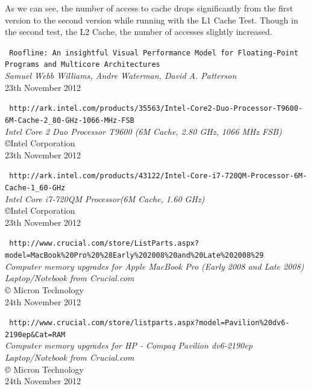 \documentclass[a4paper,10pt,openright,openbib]{article}
\begin{document}
As we can see, the number of access to cache drops significantly from the first version to the second version while running with the L1 Cache Test. Though in the second test, the L2 Cache, the number of accesses slightly increased.


\begin{thebibliography}{9}
	\texttt{\small
	Roofline: An insightful Visual Performance Model for Floating-Point Programs and Multicore Architectures}	\\
	\emph{Samuel Webb Williams, Andre Waterman, David A. Patterson}	\\
	23th November 2012

	\texttt{\small
	http://ark.intel.com/products/35563/Intel-Core2-Duo-Processor-T9600-6M-Cache-2\_80-GHz-1066-MHz-FSB}	\\
	\emph{Intel{\textregistered} Core {\texttrademark} 2 Duo Processor T9600 (6M Cache, 2.80 GHz, 1066 MHz FSB)}	\\
	{\copyright}Intel Corporation	\\
	23th November 2012

	\texttt{\small
	http://ark.intel.com/products/43122/Intel-Core-i7-720QM-Processor-6M-Cache-1\_60-GHz}	\\
	\emph{Intel{\textregistered} Core {\texttrademark} i7-720QM Processor(6M Cache, 1.60 GHz)}	\\
	{\copyright}Intel Corporation	\\
	23th November 2012

	\texttt{\small
	http://www.crucial.com/store/ListParts.aspx?model=MacBook\%20Pro\%20\%28Early\%202008\%20and\%20Late\%202008\%29}	\\
	\emph{Computer memory upgrades for Apple MacBook Pro (Early 2008 and Late 2008) Laptop/Notebook from Crucial.com }	\\
	{\copyright} Micron Technology	\\
	24th November 2012

	\texttt{\small
	http://www.crucial.com/store/listparts.aspx?model=Pavilion\%20dv6-2190ep\&Cat=RAM}	\\
	\emph{Computer memory upgrades for HP - Compaq Pavilion dv6-2190ep Laptop/Notebook from Crucial.com}	\\
	{\copyright} Micron Technology	\\
	24th November 2012	

\end{thebibliography}
\end{document}
